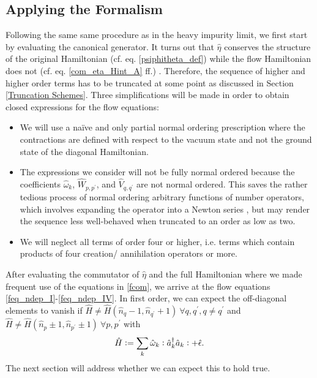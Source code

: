 \subsection{Applying the Formalism}
Following the same same procedure as in the heavy impurity limit, we first start by evaluating the canonical generator. It turns out that $\hat\eta$ conserves the structure of the original Hamiltonian (cf. eq. \ref{psiphitheta_def}) while the flow Hamiltonian does not (cf. eq. \ref{com_eta_Hint_A} ff.) . Therefore, the sequence of higher and higher order terms has to be truncated at some point as discussed in Section \ref{Truncation Schemes}. 
Three simplifications will be made in order to obtain closed expressions for the flow equations:
\begin{itemize}
\item We will use a na\"ive and only partial normal ordering prescription where the contractions are defined with respect to the vacuum state and not the ground state of the diagonal Hamiltonian.
\item The expressions we consider will not be fully normal ordered because the coefficients $\hat\omega_k $, $\hat W_{p,p^\prime}$, and $\hat V_{q,q^\prime}$ are not normal ordered. This saves the rather tedious process of normal ordering arbitrary functions of number operators, which involves expanding the operator into a Newton series \cite{10.21468/SciPostPhys.10.1.007}, but may render the sequence less well-behaved when truncated to an order as low as two.
\item  We will neglect all terms of order four or higher, i.e. terms which contain products of four creation/ annihilation operators or more.
\end{itemize}
After evaluating the commutator of $\hat\eta$ and the full Hamiltonian where we made frequent use of the equations in \ref{fcom}, we arrive at the flow equations \ref{feq_ndep_I}-\ref{feq_ndep_IV}. In first order, we can expect the off-diagonal elements to vanish if $\hat H \neq \hat H(\hat n_q-1,\hat n_{q^\prime}+1)\ \forall q,q^\prime,q\neq q^\prime$ and $\hat H \neq \hat H(\hat n_p\pm 1,\hat n_{p^\prime}\pm 1)\ \forall p,p^\prime$ with \begin{equation}\hat H\vcentcolon= \sum\limits_k \hat\omega_k \vcentcolon\hat a^\dagger_k\hat a_k\vcentcolon+\hat\epsilon. \end{equation}
The next section will address whether we can expect this to hold true.


